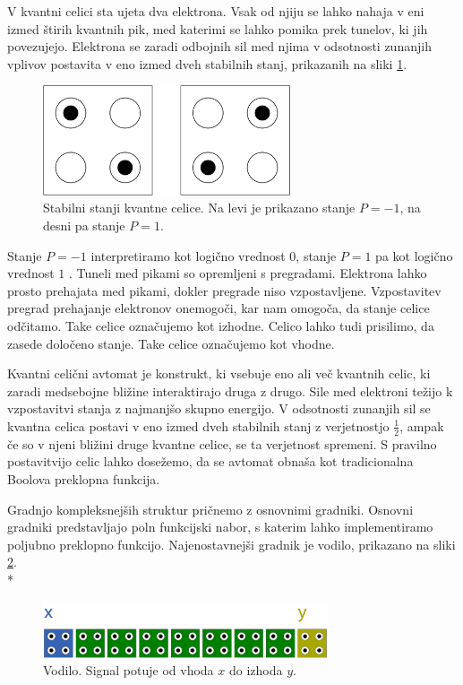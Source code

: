 \documentclass[a4paper, 11pt]{article}
\begin{document}
V kvantni celici sta ujeta dva elektrona.
Vsak od njiju se lahko nahaja v eni izmed štirih kvantnih pik, med katerimi se lahko pomika prek tunelov, ki jih povezujejo.
Elektrona se zaradi odbojnih sil med njima v odsotnosti zunanjih vplivov postavita v eno izmed dveh stabilnih stanj, prikazanih na sliki \ref{img-pregled-2states}.

\begin{figure}[h]
	\centering
	\includegraphics[width=0.65\textwidth]{../img/pregled/2states.pdf}
	\caption{Stabilni stanji kvantne celice. Na levi je prikazano stanje $P = -1$, na desni pa stanje $P = 1$.}
	\label{img-pregled-2states}
\end{figure}

Stanje $P = -1$ interpretiramo kot logično vrednost $0$, stanje $P = 1$ pa kot logično vrednost $1$ \cite{lent_1993}.
Tuneli med pikami so opremljeni s pregradami.
Elektrona lahko prosto prehajata med pikami, dokler pregrade niso vzpostavljene.
Vzpostavitev pregrad prehajanje elektronov onemogoči, kar nam omogoča, da stanje celice odčitamo.
Take celice označujemo kot izhodne.
Celico lahko tudi prisilimo, da zasede določeno stanje.
Take celice označujemo kot vhodne.

Kvantni celični avtomat je konstrukt, ki vsebuje eno ali več kvantnih celic, ki zaradi medsebojne bližine interaktirajo druga z drugo.
Sile med elektroni težijo k vzpostavitvi stanja z najmanjšo skupno energijo.
V odsotnosti zunanjih sil se kvantna celica postavi v eno izmed dveh stabilnih stanj z verjetnostjo $\frac{1}{2}$, ampak če so v njeni bližini druge kvantne celice, se ta verjetnost spremeni.
S pravilno postavitvijo celic lahko dosežemo, da se avtomat obnaša kot tradicionalna Boolova preklopna funkcija.

Gradnjo kompleksnejših struktur pričnemo z osnovnimi gradniki.
Osnovni gradniki predstavljajo poln funkcijski nabor, s katerim lahko implementiramo poljubno preklopno funkcijo.
Najenostavnejši gradnik je vodilo, prikazano na sliki \ref{img-pregled-bus}. \\*

\begin{figure}[h]
	\centering
	\includegraphics[width=0.75\textwidth]{../img/pregled/bus.pdf}
	\caption{Vodilo. Signal potuje od vhoda $x$ do izhoda $y$.}
	\label{img-pregled-bus}
\end{figure}
\end{document}
